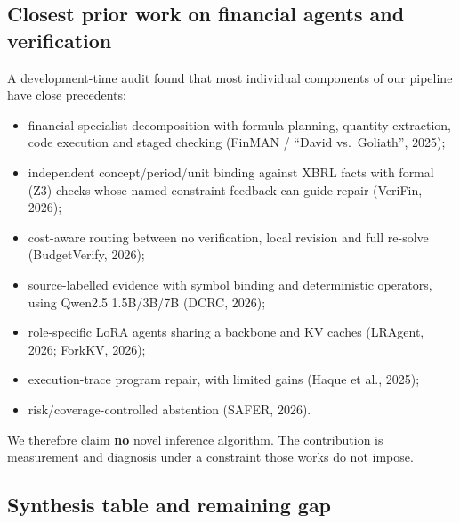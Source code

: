 \documentclass[letterpaper]{article}
\providecommand{\tightlist}{}
\begin{document}
\subsection{Closest prior work on financial agents and verification}\label{closest-prior-work-on-financial-agents-and-verification}

A development-time audit found that most individual components of our pipeline have close precedents:

\begin{itemize}
\tightlist
\item
  financial specialist decomposition with formula planning, quantity extraction, code execution and staged checking (FinMAN / ``David vs.~Goliath'', 2025);
\item
  independent concept/period/unit binding against XBRL facts with formal (Z3) checks whose named-constraint feedback can guide repair (VeriFin, 2026);
\item
  cost-aware routing between no verification, local revision and full re-solve (BudgetVerify, 2026);
\item
  source-labelled evidence with symbol binding and deterministic operators, using Qwen2.5 1.5B/3B/7B (DCRC, 2026);
\item
  role-specific LoRA agents sharing a backbone and KV caches (LRAgent, 2026; ForkKV, 2026);
\item
  execution-trace program repair, with limited gains (Haque et al., 2025);
\item
  risk/coverage-controlled abstention (SAFER, 2026).
\end{itemize}

We therefore claim \textbf{no} novel inference algorithm. The contribution is measurement and diagnosis under a constraint those works do not impose.

\subsection{Synthesis table and remaining gap}\label{synthesis-table-and-remaining-gap}
\end{document}
